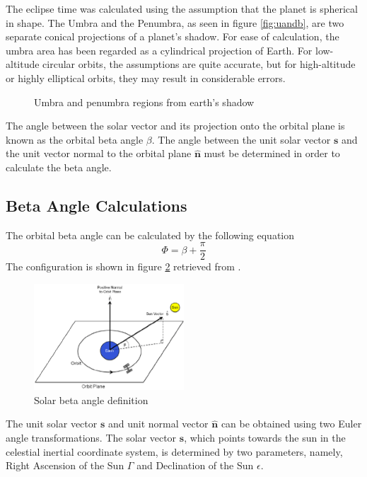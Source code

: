 The eclipse time was calculated using the assumption that the planet is spherical in shape. The Umbra and the Penumbra, as seen in figure \ref{fig:uandb}, are two separate conical projections of a planet's shadow. For ease of calculation, the umbra area has been regarded as a cylindrical projection of Earth. For low-altitude circular orbits, the assumptions are quite accurate, but for high-altitude or highly elliptical orbits, they may result in considerable errors.
\begin{figure}[H]
    \centering
{}
\caption{Umbra and penumbra regions from earth’s shadow}
\label{fig;uandb}
\end{figure}
The angle between the solar vector and its projection onto the orbital plane is known as the orbital beta angle $\beta$. The angle between the unit solar vector $\boldsymbol{s}$ and the unit vector normal to the orbital plane $\boldsymbol{\hat{n}}$ must be determined in order to calculate the beta angle. 
\subsection{Beta Angle Calculations}
The orbital beta angle can be calculated by the following equation
\begin{equation}
    \Phi = \beta + \frac{\pi}{2}
\end{equation}
The configuration is shown in figure \ref{fig:beta_angle} retrieved from \cite{bhatt2015thermally}.
\begin{figure}[H]
    \centering
    \includegraphics[width=0.5\textwidth]{Figures/beta_angle.png}
    \caption{Solar beta angle definition}
    \label{fig:beta_angle}
\end{figure}
The unit solar vector $\boldsymbol{s}$ and unit normal vector $\boldsymbol{\hat{n}}$ can be obtained using two Euler angle transformations. The solar vector $\boldsymbol{s}$, which points towards the sun in the celestial inertial coordinate system, is determined by two parameters, namely, Right Ascension of the Sun $\Gamma$ and Declination of the Sun $\epsilon$.

